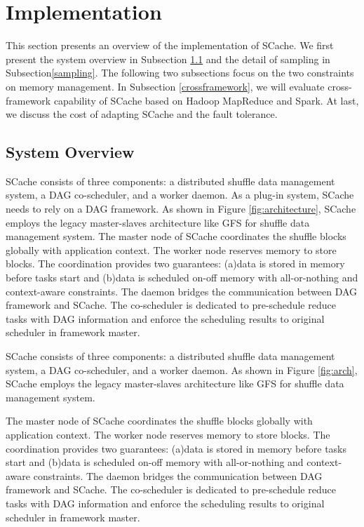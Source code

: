 \section{Implementation}\label{impl}
This section presents an overview of the implementation of SCache. 
{\color{blue}
We first present the system overview in Subsection \ref{arch} and the detail of sampling in Subsection\ref{sampling}. 
The following two subsections focus on the two constraints on memory management.
In Subsection \ref{crossframework}, we will evaluate cross-framework capability of SCache based on Hadoop MapReduce and Spark. 
At last, we discuss the cost of adapting SCache and the fault tolerance. 
}


\subsection{System Overview}\label{arch}
SCache consists of three components: a distributed shuffle data management system, a DAG co-scheduler, and a %
{\color{blue} worker daemon. As a plug-in system, SCache needs to rely on a DAG framework.} As shown in Figure \ref{fig:architecture}, SCache employs the legacy master-slaves architecture like GFS \cite{gfs} for shuffle data management system. 
The master node of SCache coordinates the shuffle blocks globally with application context. The worker node reserves memory to store blocks.
The coordination provides two guarantees: (a)data is stored in memory before tasks start and (b)data is scheduled on-off memory with all-or-nothing and context-aware constraints. 
The daemon bridges the communication between %
{\color{blue} DAG framework} and SCache. The co-scheduler is dedicated to pre-schedule reduce tasks with DAG information and enforce the scheduling results to %
 {\color{blue} original scheduler in framework master}.

SCache consists of three components: a distributed shuffle data management system, a DAG co-scheduler, and a {\color{blue} worker daemon}. As shown in Figure \ref{fig:arch}, SCache employs the legacy master-slaves architecture like GFS \cite{gfs} for shuffle data management system. 

The master node of SCache coordinates the shuffle blocks globally with application context. The worker node reserves memory to store blocks.
The coordination provides two guarantees: (a)data is stored in memory before tasks start and (b)data is scheduled on-off memory with all-or-nothing and context-aware constraints. 
The daemon bridges the communication between {\color{blue}DAG framework} and SCache. The co-scheduler is dedicated to pre-schedule reduce tasks with DAG information and enforce the scheduling results to {\color{blue} original scheduler in framework master}.

